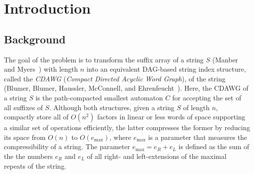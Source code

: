 \documentclass{article}
\begin{document}

\section{Introduction}
\label{sec:intro}

\subsection{Background}
The goal of the problem is to transform the suffix array of a string $S$ (Manber and Myers~\cite{manber:myers1993suffixarrays}) with length $n$ into an equivalent DAG-based string index structure, called the \textit{CDAWG} (\textit{Compact Directed Acyclic Word Graph}), of the string (Blumer, Blumer, Haussler, McConnell, and Ehrenfeucht~\cite{blumer1987complete}). Here, the CDAWG of a string $S$ is the path-compacted smallest automaton $C$ for accepting the set of all suffixes of $S$.
Although both structures, given a string $S$ of length $n$, compactly
store all of $O(n^2)$ factors in linear or less words of space supporting a similar set of operations efficiently, the latter compresses the former by reducing its space from $O(n)$ to $O(e_{\max})$, where $e_{\max}$ is a parameter that measures the compressibility of a string. The parameter $e_{\max} = e_R + e_L$ is defined as the sum of the the numbers $e_R$ and $e_L$ of all right- and left-extensions of the maximal repeats of the string.
\end{document}
